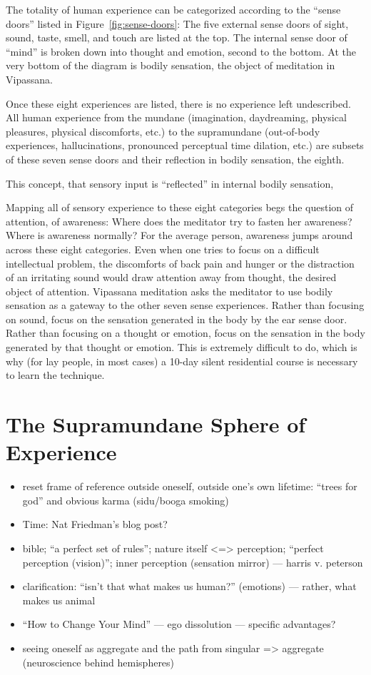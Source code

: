\documentclass[a4paper, amsfonts, amssymb, amsmath, reprint, showkeys, nofootinbib, twoside]{revtex4-1}
\begin{document}
The totality of human experience can be categorized according to the ``sense doors''
listed in Figure~\ref{fig:sense-doors}: The five external sense doors of sight, sound,
taste, smell, and touch are listed at the top. The internal sense door of ``mind'' is
broken down into thought and emotion, second to the bottom. At the very bottom of the
diagram is bodily sensation, the object of meditation in Vipassana.

Once these eight experiences are listed, there is no experience left undescribed. All
human experience from the mundane (imagination, daydreaming, physical pleasures,
physical discomforts, etc.) to the supramundane (out-of-body experiences,
hallucinations, pronounced perceptual time dilation, etc.) are subsets of these seven
sense doors and their reflection in bodily sensation, the eighth.

This concept, that sensory input is ``reflected'' in internal bodily sensation,

Mapping all of sensory experience to these eight categories begs the question of
attention, of awareness: Where does the meditator try to fasten her awareness? Where
is awareness normally? For the average person, awareness jumps around across these
eight categories. Even when one tries to focus on a difficult intellectual problem,
the discomforts of back pain and hunger or the distraction of an irritating sound
would draw attention away from thought, the desired object of attention. Vipassana
meditation asks the meditator to use bodily sensation as a gateway to the other seven
sense experiences. Rather than focusing on sound, focus on the sensation generated in
the body by the ear sense door. Rather than focusing on a thought or emotion, focus
on the sensation in the body generated by that thought or emotion. This is extremely
difficult to do, which is why (for lay people, in most cases) a 10-day silent
residential course \cite{dhamma} is necessary to learn the technique.

\section{The Supramundane Sphere of Experience}

\begin{itemize}
  \item reset frame of reference outside oneself, outside one's own lifetime: ``trees
    for god'' and obvious karma (sidu/booga smoking)
  \item Time: Nat Friedman's blog post?
  \item bible; ``a perfect set of rules''; nature itself <=> perception; ``perfect
    perception (vision)''; inner perception (sensation mirror) --- harris v. peterson
  \item clarification: ``isn't that what makes us human?'' (emotions) --- rather,
    what makes us animal
  \item ``How to Change Your Mind'' --- ego dissolution --- specific advantages?
  \item seeing oneself as aggregate and the path from singular => aggregate
    (neuroscience behind hemispheres)
\end{itemize}
\end{document}

